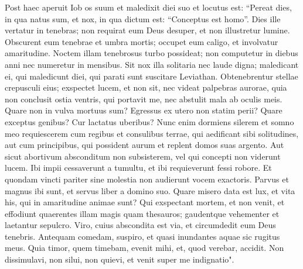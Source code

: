 \begin{biblechapter}  
\verse Post haec aperuit Iob os suum et maledixit diei suo 
\verse et locutus est: 
\verse “Pereat dies, in qua natus sum, et nox, in qua dictum est: “Conceptus est homo”. 
\verse Dies ille vertatur in tenebras; non requirat eum Deus desuper, et non illustretur lumine. 
\verse Obscurent eum tenebrae et umbra mortis; occupet eum caligo, et involvatur amaritudine. 
\verse Noctem illam tenebrosus turbo possideat; non computetur in diebus anni nec numeretur in mensibus. 
\verse Sit nox illa solitaria nec laude digna; 
\verse maledicant ei, qui maledicunt diei, qui parati sunt suscitare Leviathan. 
\verse Obtenebrentur stellae crepusculi eius; exspectet lucem, et non sit, nec videat palpebras aurorae, 
\verse quia non conclusit ostia ventris, qui portavit me, nec abstulit mala ab oculis meis. 
\verse Quare non in vulva mortuus sum? Egressus ex utero non statim perii? 
\verse Quare exceptus genibus? Cur lactatus uberibus? 
\verse Nunc enim dormiens silerem et somno meo requiescerem 
\verse cum regibus et consulibus terrae, qui aedificant sibi solitudines, 
\verse aut cum principibus, qui possident aurum et replent domos suas argento. 
\verse Aut sicut abortivum absconditum non subsisterem, vel qui concepti non viderunt lucem. 
\verse Ibi impii cessaverunt a tumultu, et ibi requieverunt fessi robore. 
\verse Et quondam vincti pariter sine molestia non audierunt vocem exactoris. 
\verse Parvus et magnus ibi sunt, et servus liber a domino suo. 
\verse Quare misero data est lux, et vita his, qui in amaritudine animae sunt? 
\verse Qui exspectant mortem, et non venit, et effodiunt quaerentes illam magis quam thesauros; 
\verse gaudentque vehementer et laetantur sepulcro. 
\verse Viro, cuius abscondita est via, et circumdedit eum Deus tenebris. 
\verse Antequam comedam, suspiro, et quasi inundantes aquae sic rugitus meus. 
\verse Quia timor, quem timebam, evenit mihi, et, quod verebar, accidit. 
\verse Non dissimulavi, non silui, non quievi, et venit super me indignatio". 
\end{biblechapter}

